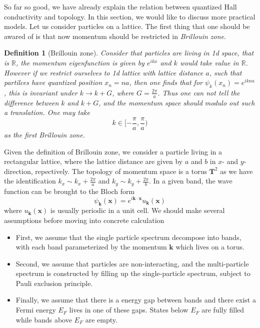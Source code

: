 \documentclass[12pt,a4paper]{article}
\numberwithin{equation}{section}
\newtheorem{definition}{Definition}
\begin{document}
So far so good, we have already explain the relation between quantized Hall conductivity and topology. In this section, we would like to discuss more practical models.
Let us consider particles on a lattice. The first thing that one should be awared of is that now momentum should be restricted in \textit{Brillouin zone}. 
\begin{definition}[Brillouin zone]
    Consider that particles are living in 1d space, that is $\mathbb{R}$, the momentum eigenfunction is given by $e^{ikx}$ and $k$ would take value in $\mathbb{R}$. However if we restrict ourselves
    to 1d lattice with lattice distance $a$, such that partilces have quantized position $x_n=na$, then one finds that for $\psi_k(x_n) = e^{ikna}$, this is invariant under $k\to k+G$, where $G=\frac{2\pi}{a}$.
    Thus one can not tell the difference between $k$ and $k+G$, and the momentum space should modulo out such a translation. One may take 
    \begin{equation}
        k \in [-\frac{\pi}{a},\frac{\pi}{a})
    \end{equation}
    as the first Brillouin zone.
\end{definition}

Given the definition of Brillouin zone, we consider a particle living in a rectangular lattice, where the lattice distance are given by $a$ and $b$ in $x$- and $y$-direction, repectively.
The topology of momentum space is a torus $\mathbf{T}^2$ as we have the identification $k_x\sim k_x+ \frac{2\pi}{a}$ and $k_y\sim k_y+ \frac{2\pi}{b}$.
In a given band, the wave function can be brought to the Bloch form
\begin{equation}
    \psi_{\mathbf{k}}(\mathbf{x}) = e^{i\mathbf{k}\cdot \mathbf{x}}u_{\mathbf{k}}(\mathbf{x})
\end{equation}
where $u_{\mathbf{k}}(\mathbf{x})$ is usually periodic in a unit cell. We should make several assumptions before moving into concrete calculation
\begin{itemize}
    \item First, we assume that the single particle spectrum decompose into bands, with each band parameterized by the momentum $\mathbf{k}$ which lives on a torus.
    \item Second, we assume that particles are non-interacting, and the multi-particle spectrum is constructed by filling up the single-particle spectrum, subject to Pauli exclusion principle.
    \item Finally, we assume that there is a energy gap between bands and there exist a Fermi energy $E_F$ lives in one of these gaps. States below $E_F$ are fully filled while bands above $E_F$ are empty.
\end{itemize}
\end{document}
